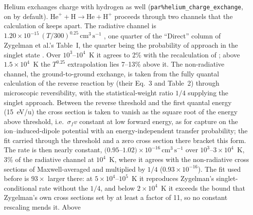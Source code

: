 \documentclass[twocolumn,linenumbers]{aastex702}
\newcommand{\code}[1]{\texttt{#1}}
\newcommand{\cmc}{\mathrm{cm^{3}\,s^{-1}}}
\begin{document}
Helium exchanges charge with hydrogen as well
(\code{par\%helium\_charge\_exchange}, on by default).
$\mathrm{He}^{+} + \mathrm{H} \to \mathrm{He} + \mathrm{H}^{+}$ proceeds
through two channels that the calculation of \citet{zygelman1989} keeps
apart.  The radiative channel is
$1.20\times10^{-15}\,(T/300)^{0.25}\,\cmc$
\citep[][Table~1, reaction 19]{stancil1998}, one quarter of the ``Direct''
column of Zygelman et al.'s Table~I, the quarter being the probability of
approach in the singlet state \citep[][Eqs.~4--6]{courtney2021}.  Over
$10^3$--$10^4$~K it agrees to 2\% with the recalculation of
\citet{courtney2021}; above $1.5\times10^4$~K the $T^{0.25}$ extrapolation
lies 7--13\% above it.  The
non-radiative channel, the ground-to-ground exchange, is taken from the
fully quantal calculation of the reverse reaction by \citet{loreau2014}
(their Eq.~3 and Table~2) through microscopic reversibility, with the
statistical-weight ratio $1/4$ supplying the singlet approach.  Between
the reverse threshold and the first quantal energy (15~eV/u) the cross
section is taken to vanish as the square root of the energy above
threshold, i.e.\ $\sigma_f v$ constant at low forward energy, as for
capture on the ion--induced-dipole potential with an energy-independent
transfer probability; the fit carried through the threshold and a zero
cross section there bracket this form.  The rate is then nearly constant,
$(0.95$--$1.02)\times10^{-16}\,\cmc$ over $10^3$--$3\times10^4$~K, 3\% of
the radiative channel at $10^4$~K, where it agrees with the non-radiative
cross sections of \citet{zygelman1989} Maxwell-averaged and multiplied by
$1/4$ ($0.93\times10^{-16}$).  The \citet{kingdon1996} fit used before is
$93\times$ larger there: at $5\times10^4$--$10^5$~K it reproduces
Zygelman's singlet-conditional rate without the $1/4$, and below
$2\times10^4$~K it exceeds the bound that Zygelman's own cross sections set
by at least a factor of 11, so no constant rescaling mends it.  Above
\end{document}
